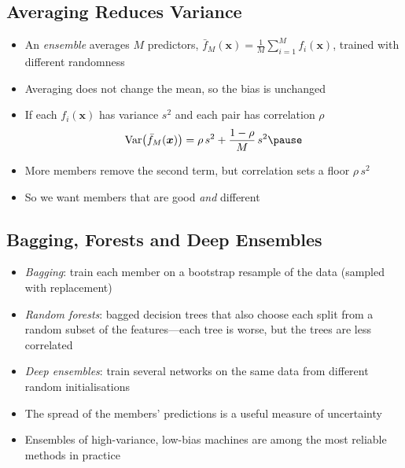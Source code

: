 \Outline %

\begin{slide}
\section[-1]{Averaging Reduces Variance}

\begin{PauseHighLight}
  \begin{itemize}
  \item An \emph{ensemble} averages $M$ predictors,
    $\bar{f}_M(\bm{x}) = \frac{1}{M}\sum_{i=1}^M f_i(\bm{x})$, trained
    with different randomness\pause
  \item Averaging does not change the mean, so the bias is
    unchanged\pause
  \item If each $f_i(\bm{x})$ has variance $s^2$ and each pair has
    correlation $\rho$
    \begin{align*}
      \mathrm{Var}\bigl(\bar{f}_M(\bm{x})\bigr) = \rho\,s^2 +
      \frac{1-\rho}{M}\,s^2\pause
    \end{align*}
  \item More members remove the second term, but correlation sets a
    floor $\rho\,s^2$\pause
  \item So we want members that are good \emph{and} different\pause
  \end{itemize}
\end{PauseHighLight}

\end{slide}


\begin{slide}
\section[-1]{Bagging, Forests and Deep Ensembles}

\begin{PauseHighLight}
  \begin{itemize}
  \item \emph{Bagging}: train each member on a bootstrap resample of the
    data (sampled with replacement)\pause
  \item \emph{Random forests}: bagged decision trees that also choose
    each split from a random subset of the features\pause{}---each tree
    is worse, but the trees are less correlated\pauseb
  \item \emph{Deep ensembles}: train several networks on the same data
    from different random initialisations\pause
  \item The spread of the members' predictions is a useful measure of
    uncertainty\pause
  \item Ensembles of high-variance, low-bias machines are among the
    most reliable methods in practice\pause
  \end{itemize}
\end{PauseHighLight}

\end{slide}

